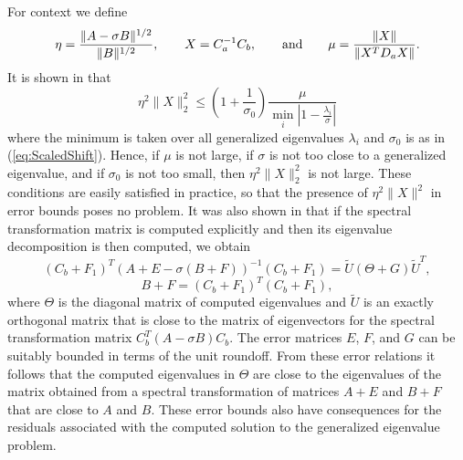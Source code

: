 For context we define
\begin{equation*}
  \eta = \frac{\|A-\sigma B\|^{1/2}}{\|B\|^{1/2}},\qquad
  X = C_a^{-1} C_b,\eqand \mu = \frac{\|X\|}{\|X^T D_a X\|}.
\end{equation*}
It is shown in \cite{stewart2024spectraltransformationdensesymmetric} that
\begin{equation*}
  \eta^2 \|X\|_2^2 \leq \left( 1 + \frac{1}{\sigma_0} \right)
  \frac{\mu}{\min_i \left| 1 - \frac{\lambda_i}{\sigma}\right|}
\end{equation*}
where the minimum is taken over all generalized eigenvalues $\lambda_i$ and $\sigma_0$ is as in (\ref{eq:ScaledShift}).  Hence, if $\mu$ is not large, if $\sigma$ is not too close to a generalized eigenvalue, and if $\sigma_0$ is not too small, then $\eta^2 \|X\|_2^2$ is not large.  These conditions are easily satisfied in practice, so that the presence of $\eta^2 \|X\|^2$ in error bounds poses no problem.  It was also shown in \cite{stewart2024spectraltransformationdensesymmetric} that if the spectral transformation matrix is computed explicitly and then its eigenvalue decomposition is then computed, we obtain
\begin{equation}
  \label{eq:mixed_errors}
  (C_b + F_1)^T (A+E - \sigma (B+F))^{-1} (C_b + F_1) 
  = \tilde{U} (\Theta + G) \tilde{U}^T,
\end{equation}
\begin{equation}
  \label{eq:B_errors}
  B+F = (C_b + F_1)^T (C_b +F_1),
\end{equation}
where $\Theta$ is the diagonal matrix of computed eigenvalues and $\tilde{U}$ is an exactly orthogonal matrix that is close to the matrix of eigenvectors for the spectral transformation matrix $C_b^T(A-\sigma B) C_b$.  The error matrices $E$, $F$, and $G$ can be suitably bounded in terms of the unit roundoff.  From these error relations it follows that the computed eigenvalues in $\Theta$ are close to the eigenvalues of the matrix obtained from a spectral transformation of matrices $A+E$ and $B+F$ that are close to $A$ and $B$.  These error bounds also have consequences for the residuals associated with the computed solution to the generalized eigenvalue problem.

